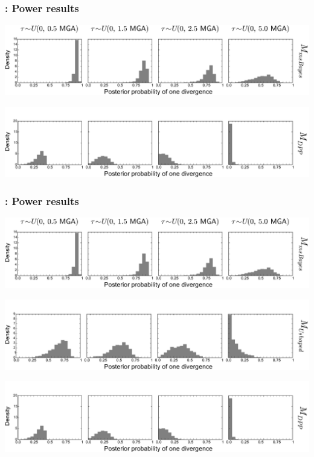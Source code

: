 \begin{frame}[t]
    \frametitle{\dppmsbayes: Power results}
    \vspace{1cm}
        \centerline{
        \includegraphics[width=1.13\textwidth]{../images/old_old_power_psi_prob.pdf}}
        \vspace{0mm}
        \centerline{
        \includegraphics[width=1.13\textwidth]{../images/old_dpp_power_psi_prob_headless.pdf}}
\end{frame}

\begin{frame}
    \frametitle{\dppmsbayes: Power results}
        \centerline{
        \includegraphics[width=\textwidth]{../images/old_old_power_psi_prob.pdf}}
        \vspace{0mm}
        \centerline{
        \includegraphics[width=\textwidth]{../images/old_u-shaped_power_psi_prob_headless.pdf}}
        \vspace{0mm}
        \centerline{
        \includegraphics[width=\textwidth]{../images/old_dpp_power_psi_prob_headless.pdf}}
\end{frame}

